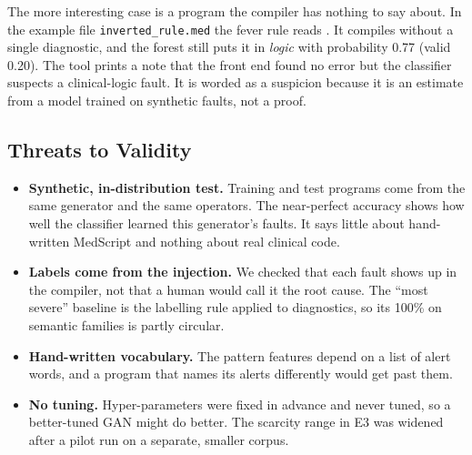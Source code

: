 The more interesting case is a program the compiler has nothing to say about. In the example file
\texttt{inverted\_rule.med} the fever rule reads . It compiles without a single
diagnostic, and the forest still puts it in \emph{logic} with probability 0.77 (valid 0.20). The tool prints a note
that the front end found no error but the classifier suspects a clinical-logic fault. It is worded as a suspicion
because it is an estimate from a model trained on synthetic faults, not a proof.

\subsection{Threats to Validity}
\label{sec:limits}

\begin{itemize}
    \item \textbf{Synthetic, in-distribution test.} Training and test programs come from the same generator and the same
    operators. The near-perfect accuracy shows how well the classifier learned this generator's faults. It says little
    about hand-written MedScript and nothing about real clinical code.
    \item \textbf{Labels come from the injection.} We checked that each fault shows up in the compiler, not that a human
    would call it the root cause. The ``most severe'' baseline is the labelling rule applied to diagnostics, so its 100\%
    on semantic families is partly circular.
    \item \textbf{Hand-written vocabulary.} The pattern features depend on a list of alert words, and a program that names
    its alerts differently would get past them.
    \item \textbf{No tuning.} Hyper-parameters were fixed in advance and never tuned, so a better-tuned GAN might do better.
    The scarcity range in E3 was widened after a pilot run on a separate, smaller corpus.
\end{itemize}
